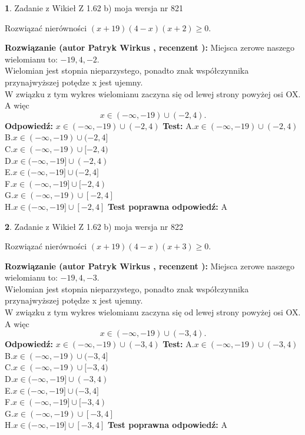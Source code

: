 \documentclass[12pt, a4paper]{article}
\theoremstyle{definition} %
\newtheorem{zad}{}
\newcommand{\zadStart}[1]{\begin{zad}#1\newline}
\newcommand{\zadStop}{\end{zad}}
\newcommand{\rozwStart}[2]{\noindent \textbf{Rozwiązanie (autor #1 , recenzent #2): }\newline}
\newcommand{\rozwStop}{\newline}
\newcommand{\odpStart}{\noindent \textbf{Odpowiedź:}\newline}
\newcommand{\odpStop}{\newline}
\newcommand{\testStart}{\noindent \textbf{Test:}\newline}
\newcommand{\testStop}{\newline}
\newcommand{\kluczStart}{\noindent \textbf{Test poprawna odpowiedź:}\newline}
\newcommand{\kluczStop}{\newline}
\begin{document}
\zadStart{Zadanie z Wikieł Z 1.62 b) moja wersja nr 821}

Rozwiązać nierówności $(x+19)(4-x)(x+2)\ge0$.
\zadStop
\rozwStart{Patryk Wirkus}{}
Miejsca zerowe naszego wielomianu to: $-19, 4, -2$.\\
Wielomian jest stopnia nieparzystego, ponadto znak współczynnika przy\linebreak najwyższej potędze x jest ujemny.\\ W związku z tym wykres wielomianu zaczyna się od lewej strony powyżej osi OX. A więc $$x \in (-\infty,-19) \cup (-2,4).$$
\rozwStop
\odpStart
$x \in (-\infty,-19) \cup (-2,4)$
\odpStop
\testStart
A.$x \in (-\infty,-19) \cup (-2,4)$\\
B.$x \in (-\infty,-19) \cup (-2,4]$\\
C.$x \in (-\infty,-19) \cup [-2,4)$\\
D.$x \in (-\infty,-19] \cup (-2,4)$\\
E.$x \in (-\infty,-19] \cup (-2,4]$\\
F.$x \in (-\infty,-19] \cup [-2,4)$\\
G.$x \in (-\infty,-19) \cup [-2,4]$\\
H.$x \in (-\infty,-19] \cup [-2,4]$
\testStop
\kluczStart
A
\kluczStop



\zadStart{Zadanie z Wikieł Z 1.62 b) moja wersja nr 822}

Rozwiązać nierówności $(x+19)(4-x)(x+3)\ge0$.
\zadStop
\rozwStart{Patryk Wirkus}{}
Miejsca zerowe naszego wielomianu to: $-19, 4, -3$.\\
Wielomian jest stopnia nieparzystego, ponadto znak współczynnika przy\linebreak najwyższej potędze x jest ujemny.\\ W związku z tym wykres wielomianu zaczyna się od lewej strony powyżej osi OX. A więc $$x \in (-\infty,-19) \cup (-3,4).$$
\rozwStop
\odpStart
$x \in (-\infty,-19) \cup (-3,4)$
\odpStop
\testStart
A.$x \in (-\infty,-19) \cup (-3,4)$\\
B.$x \in (-\infty,-19) \cup (-3,4]$\\
C.$x \in (-\infty,-19) \cup [-3,4)$\\
D.$x \in (-\infty,-19] \cup (-3,4)$\\
E.$x \in (-\infty,-19] \cup (-3,4]$\\
F.$x \in (-\infty,-19] \cup [-3,4)$\\
G.$x \in (-\infty,-19) \cup [-3,4]$\\
H.$x \in (-\infty,-19] \cup [-3,4]$
\testStop
\kluczStart
A
\kluczStop
\end{document}
